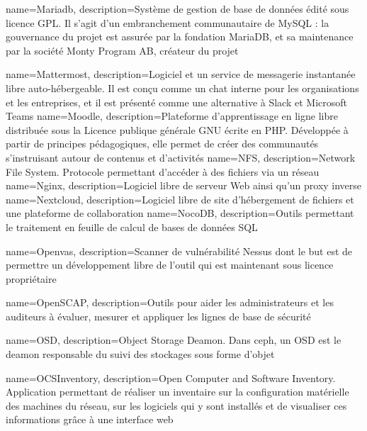 {
    name=Mariadb,
    description={Système de gestion de base de données édité sous licence GPL. Il s'agit d'un embranchement communautaire de MySQL : la gouvernance du projet est assurée par la fondation MariaDB, et sa maintenance par la société Monty Program AB, créateur du projet}
}


{
    name=Mattermost,
    description={Logiciel et un service de messagerie instantanée libre auto-hébergeable. Il est conçu comme un chat interne pour les organisations et les entreprises, et il est présenté comme une alternative à Slack et Microsoft Teams}
}
{
    name=Moodle,
    description={Plateforme d'apprentissage en ligne libre distribuée sous la Licence publique générale GNU écrite en PHP. Développée à partir de principes pédagogiques, elle permet de créer des communautés s'instruisant autour de contenus et d'activités}
}
{
    name=NFS,
    description={Network File System. Protocole permettant d'accéder à des fichiers via un réseau}
}
{
    name=Nginx,
    description={Logiciel libre de serveur Web ainsi qu'un proxy inverse}
}
{
    name=Nextcloud,
    description={Logiciel libre de site d'hébergement de fichiers et une plateforme de collaboration}
}
{
    name=NocoDB,
    description={Outils permettant le traitement en feuille de calcul de bases de données SQL}
}

{
    name=Openvas,
    description={Scanner de vulnérabilité Nessus dont le but est de permettre un développement libre de l’outil qui est maintenant sous licence propriétaire}
}

{
    name=OpenSCAP,
    description={Outils pour aider les administrateurs et les auditeurs à évaluer, mesurer et appliquer les lignes de base de sécurité}
}

{
    name=OSD,
    description={Object Storage Deamon. Dans ceph, un OSD est le deamon responsable du suivi des stockages sous forme d'objet}
}

{
    name=OCSInventory,
    description={Open Computer and Software Inventory. Application permettant de réaliser un inventaire sur la configuration matérielle des machines du réseau, sur les logiciels qui y sont installés et de visualiser ces informations grâce à une interface web}
}

